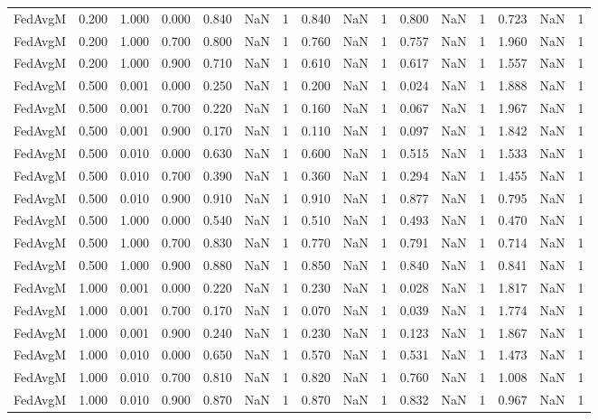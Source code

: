 \begin{table}[htbp]
\begin{tabular}{lccccccccccccccc}
FedAvgM & 0.200 & 1.000 & 0.000 & 0.840 & NaN & 1 & 0.840 & NaN & 1 & 0.800 & NaN & 1 & 0.723 & NaN & 1 \\
FedAvgM & 0.200 & 1.000 & 0.700 & 0.800 & NaN & 1 & 0.760 & NaN & 1 & 0.757 & NaN & 1 & 1.960 & NaN & 1 \\
FedAvgM & 0.200 & 1.000 & 0.900 & 0.710 & NaN & 1 & 0.610 & NaN & 1 & 0.617 & NaN & 1 & 1.557 & NaN & 1 \\
FedAvgM & 0.500 & 0.001 & 0.000 & 0.250 & NaN & 1 & 0.200 & NaN & 1 & 0.024 & NaN & 1 & 1.888 & NaN & 1 \\
FedAvgM & 0.500 & 0.001 & 0.700 & 0.220 & NaN & 1 & 0.160 & NaN & 1 & 0.067 & NaN & 1 & 1.967 & NaN & 1 \\
FedAvgM & 0.500 & 0.001 & 0.900 & 0.170 & NaN & 1 & 0.110 & NaN & 1 & 0.097 & NaN & 1 & 1.842 & NaN & 1 \\
FedAvgM & 0.500 & 0.010 & 0.000 & 0.630 & NaN & 1 & 0.600 & NaN & 1 & 0.515 & NaN & 1 & 1.533 & NaN & 1 \\
FedAvgM & 0.500 & 0.010 & 0.700 & 0.390 & NaN & 1 & 0.360 & NaN & 1 & 0.294 & NaN & 1 & 1.455 & NaN & 1 \\
FedAvgM & 0.500 & 0.010 & 0.900 & 0.910 & NaN & 1 & 0.910 & NaN & 1 & 0.877 & NaN & 1 & 0.795 & NaN & 1 \\
FedAvgM & 0.500 & 1.000 & 0.000 & 0.540 & NaN & 1 & 0.510 & NaN & 1 & 0.493 & NaN & 1 & 0.470 & NaN & 1 \\
FedAvgM & 0.500 & 1.000 & 0.700 & 0.830 & NaN & 1 & 0.770 & NaN & 1 & 0.791 & NaN & 1 & 0.714 & NaN & 1 \\
FedAvgM & 0.500 & 1.000 & 0.900 & 0.880 & NaN & 1 & 0.850 & NaN & 1 & 0.840 & NaN & 1 & 0.841 & NaN & 1 \\
FedAvgM & 1.000 & 0.001 & 0.000 & 0.220 & NaN & 1 & 0.230 & NaN & 1 & 0.028 & NaN & 1 & 1.817 & NaN & 1 \\
FedAvgM & 1.000 & 0.001 & 0.700 & 0.170 & NaN & 1 & 0.070 & NaN & 1 & 0.039 & NaN & 1 & 1.774 & NaN & 1 \\
FedAvgM & 1.000 & 0.001 & 0.900 & 0.240 & NaN & 1 & 0.230 & NaN & 1 & 0.123 & NaN & 1 & 1.867 & NaN & 1 \\
FedAvgM & 1.000 & 0.010 & 0.000 & 0.650 & NaN & 1 & 0.570 & NaN & 1 & 0.531 & NaN & 1 & 1.473 & NaN & 1 \\
FedAvgM & 1.000 & 0.010 & 0.700 & 0.810 & NaN & 1 & 0.820 & NaN & 1 & 0.760 & NaN & 1 & 1.008 & NaN & 1 \\
FedAvgM & 1.000 & 0.010 & 0.900 & 0.870 & NaN & 1 & 0.870 & NaN & 1 & 0.832 & NaN & 1 & 0.967 & NaN & 1 \\

\end{tabular}
\end{table}
